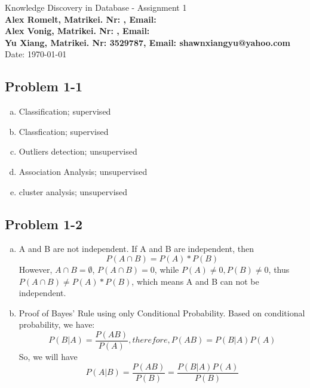 \documentclass[]{book}
\theoremstyle{definition}
\begin{document}
\begin{center}
{\Large Knowledge Discovery in Database  - Assignment 1 \hspace{0.5cm}}\\
\textbf{Alex Romelt, Matrikei. Nr:  , Email: \\ Alex Vonig, Matrikei. Nr:   , Email: 	\\ Yu Xiang,  Matrikei. Nr: 3529787,  Email: shawnxiangyu@yahoo.com}\\ %
Date: \today %
\end{center}

\vspace{0.2 cm}


\subsection*{Problem 1-1}
\begin{enumerate}[(a)] %
	\item Classification; supervised
	\item Classfication; supervised
	\item Outliers detection; unsupervised
	\item Association Analysis; unsupervised
	\item cluster analysis; unsupervised
\end{enumerate}



\subsection*{Problem 1-2}
\begin{enumerate}[(a)] %
	\item A and B are not independent. \newline
	If A and B are independent, then $$P(A\cap B) = P(A) * P(B) $$
	However, $A\cap B = \emptyset$, $P(A\cap B) = 0$, while $P(A)\neq 0, P(B)\neq 0 $, thus $P(A\cap B) \neq P(A) * P(B)$, which means A and B can not be independent.
	
	\item Proof of Bayes' Rule using only Conditional Probability. \newline
	Based on conditional probability, we have:
	$$P(B|A) =\frac{P(AB)}{P(A)}, therefore, P(AB) = P(B|A)P(A)$$ 
	So, we will have
	$$P(A|B) =\frac{P(AB)}{P(B)} = \frac{P(B|A)P(A)}{P(B)}$$	
\end{enumerate}
\end{document}
